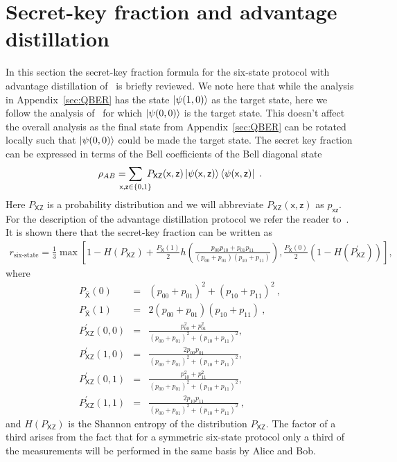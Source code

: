 \documentclass[aps,pra,reprint,superscriptaddress]{revtex4-1}
\newcommand{\san}[1]{\mathsf{#1}}
\begin{document}
\section{Secret-key fraction and advantage distillation}
\label{sec:secretkeyfracderiv}
In this section the secret-key fraction formula for the six-state protocol with advantage distillation of~\cite{watanabe2007key} is briefly reviewed. We note here that while the analysis in Appendix~\ref{sec:QBER} has the state $\ket{\psi(1,0)}$ as the target state, here we follow the analysis of~\cite{watanabe2007key} for which $\ket{\psi(0,0)}$ is the target state. This doesn't affect the overall analysis as the final state from Appendix~\ref{sec:QBER} can be rotated locally such that $\ket{\psi(0,0)}$ could be made the target state.
The secret key fraction can be expressed in terms of the Bell coefficients of the Bell diagonal state
\begin{eqnarray}
\rho_{AB} = \sum_{\mathclap{\san{x},\san{z} \in \{0,1\} }}\; P_{\san{XZ}}(\san{x},\san{z})
\ket{\psi(\san{x},\san{z})}\bra{\psi(\san{x},\san{z})}\ .
\end{eqnarray}
Here $P_{\san{XZ}}$ is a probability distribution and we will abbreviate $P_{\san{XZ}}(\san{x}, \san{z})$ as $p_{\san{xz}}$. For the description of the advantage distillation protocol we refer the reader to~\cite{watanabe2007key}. It is shown there that the secret-key fraction can be written as
\begin{eqnarray} 
r_{\text{six-state}} = \frac{1}{3}\max \left[1 - H(P_{\san{XZ}}) + \frac{P_{\bar{\san{X}}}(1)}{2}
h\left( \frac{p_{00} p_{10} + p_{01} p_{11}}{
(p_{00} + p_{01})(p_{10} + p_{11})}\right), 
\frac{P_{\bar{\san{X}}}(0)}{2} (
1 - H(P_{\san{XZ}}^\prime) ) \right] ,
\label{eq-key-rate-vs-error-rate}
\end{eqnarray} 
where
\begin{eqnarray}
P_{\bar{\san{X}}}(0) &=& (p_{00} + p_{01})^2
+ (p_{10} + p_{11})^2\ , \\
P_{\bar{\san{X}}}(1) &=& 2 (p_{00} + p_{01})
(p_{10} + p_{11})\ , \\
P_{\san{XZ}}^\prime(0,0) &=&
\frac{p_{00}^2 + p_{01}^2}{(p_{00} + p_{01})^2 + (p_{10}+p_{11})^2}, \\
P_{\san{XZ}}^\prime(1,0) &=& 
\frac{2 p_{00} p_{01}}{(p_{00} + p_{01})^2 + (p_{10}+p_{11})^2}, \\
P_{\san{XZ}}^\prime(0,1) &=&
\frac{p_{10}^2 + p_{11}^2}{(p_{00} + p_{01})^2 + (p_{10}+p_{11})^2}, \\
P_{\san{XZ}}^\prime(1,1) &=&
\frac{2 p_{10}p_{11} }{(p_{00} + p_{01})^2 + (p_{10}+p_{11})^2} \ ,
\end{eqnarray}
and $H(P_{\san{XZ}})$ is the Shannon entropy of the distribution $P_{\san{XZ}}$. The factor of a third arises from the fact that for a symmetric six-state protocol only a third of the measurements will be performed in the same basis by Alice and Bob.
\end{document}
